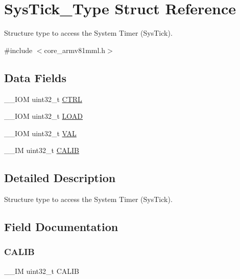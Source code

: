 \hypertarget{struct_sys_tick___type}{}\section{Sys\+Tick\+\_\+\+Type Struct Reference}
\label{struct_sys_tick___type}


Structure type to access the System Timer (Sys\+Tick).  




{\ttfamily \#include $<$core\+\_\+armv81mml.\+h$>$}

\subsection*{Data Fields}
\begin{DoxyCompactItemize}
\item 
\+\_\+\+\_\+\+I\+OM uint32\+\_\+t \mbox{\hyperlink{struct_sys_tick___type_ac81efc171e9852a36caeb47122bfec5b}{C\+T\+RL}}
\item 
\+\_\+\+\_\+\+I\+OM uint32\+\_\+t \mbox{\hyperlink{struct_sys_tick___type_a0c1333686137b7e25a46bd548a5b5bc3}{L\+O\+AD}}
\item 
\+\_\+\+\_\+\+I\+OM uint32\+\_\+t \mbox{\hyperlink{struct_sys_tick___type_ae7a655a853654127f3dfb7fa32c3f457}{V\+AL}}
\item 
\+\_\+\+\_\+\+IM uint32\+\_\+t \mbox{\hyperlink{struct_sys_tick___type_aedf0dff29a9cacdaa2fb7eec6b116a13}{C\+A\+L\+IB}}
\end{DoxyCompactItemize}


\subsection{Detailed Description}
Structure type to access the System Timer (Sys\+Tick). 

\subsection{Field Documentation}
\mbox{\label{struct_sys_tick___type_aedf0dff29a9cacdaa2fb7eec6b116a13}} 
\subsubsection{\texorpdfstring{CALIB}{CALIB}}
{\footnotesize\ttfamily \+\_\+\+\_\+\+IM uint32\+\_\+t C\+A\+L\+IB}

